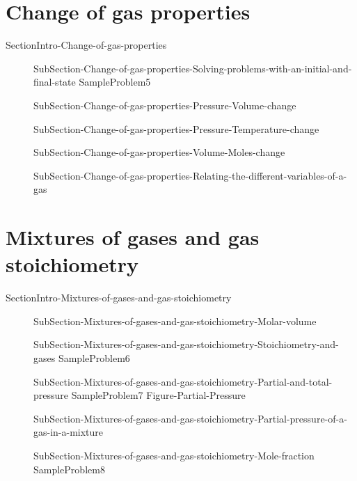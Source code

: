 \documentclass[main.tex]{subfiles}
\newcommand\chapterlabel{Ch-Gas}\setcounter{figurenewcounter}{0}\setcounter{tablenewcounter}{0}\setcounter{formulanewcounter}{0}\chapterpicture{../{\chapterlabel}/figure1}\chapterpicturelabel{PngImg}
\begin{document}
 \section{Change of gas properties}{SectionIntro-Change-of-gas-properties}
\sloppy \begin{description}
\item[]  {SubSection-Change-of-gas-properties-Solving-problems-with-an-initial-and-final-state}
{SampleProblem5}
\item[] {SubSection-Change-of-gas-properties-Pressure-Volume-change}
\item[] {SubSection-Change-of-gas-properties-Pressure-Temperature-change}
 \item[] {SubSection-Change-of-gas-properties-Volume-Moles-change}
\item[]  {SubSection-Change-of-gas-properties-Relating-the-different-variables-of-a-gas}
\end{description}





 
 \section{Mixtures of gases and gas stoichiometry}{SectionIntro-Mixtures-of-gases-and-gas-stoichiometry}
\sloppy \begin{description}
 \item[] {SubSection-Mixtures-of-gases-and-gas-stoichiometry-Molar-volume}
\item[]  {SubSection-Mixtures-of-gases-and-gas-stoichiometry-Stoichiometry-and-gases}
{SampleProblem6}
 \item[] 
{SubSection-Mixtures-of-gases-and-gas-stoichiometry-Partial-and-total-pressure}
{SampleProblem7}
 {Figure-Partial-Pressure}
\item[]  {SubSection-Mixtures-of-gases-and-gas-stoichiometry-Partial-pressure-of-a-gas-in-a-mixture}
\item[]  {SubSection-Mixtures-of-gases-and-gas-stoichiometry-Mole-fraction}
{SampleProblem8}
\end{description}
\end{document}
